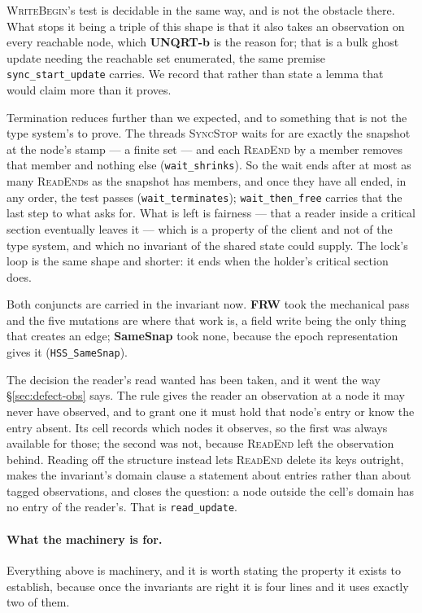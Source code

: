 \textsc{WriteBegin}'s test is decidable in the same way, and is not the obstacle
there.  What stops it being a triple of this shape is that it also takes an
\itr{} observation on every reachable node, which \textbf{UNQRT-b} is the reason
for; that is a bulk ghost update needing the reachable set enumerated, the same
premise \texttt{sync\_start\_update} carries.  We record that rather than state
a lemma that would claim more than it proves.

Termination reduces further than we expected, and to something that is not the
type system's to prove.  The threads \textsc{SyncStop} waits for are exactly the
snapshot at the node's stamp --- a finite set --- and each \textsc{ReadEnd} by a
member removes that member and nothing else (\texttt{wait\_shrinks}).  So the
wait ends after at most as many \textsc{ReadEnd}s as the snapshot has members,
and once they have all ended, in any order, the test passes
(\texttt{wait\_terminates}); \texttt{wait\_then\_free} carries that the last
step to what \frbl{} asks for.  What is left is fairness --- that a reader
inside a critical section eventually leaves it --- which is a property of the
client and not of the type system, and which no invariant of the shared state
could supply.  The lock's loop is the same shape and shorter: it ends when the
holder's critical section does.

Both conjuncts are carried in the invariant now.  \textbf{FRW} took the
mechanical pass and the five mutations are where that work is, a field write
being the only thing that creates an edge; \textbf{SameSnap} took none, because
the epoch representation gives it (\texttt{HSS\_SameSnap}).

The decision the reader's read wanted has been taken, and it went the way
\S\ref{sec:defect-obs} says.  The rule gives the reader an observation at a node
it may never have observed, and to grant one it must hold that node's entry or
know the entry absent.  Its cell records which nodes it observes, so the first
was always available for those; the second was not, because \textsc{ReadEnd}
left the \rt{} observation behind.  Reading \rt{} off the structure instead lets
\textsc{ReadEnd} delete its keys outright, makes the invariant's domain clause a
statement about entries rather than about tagged observations, and closes the
question: a node outside the cell's domain has no entry of the reader's.  That
is \texttt{read\_update}.

\paragraph{What the machinery is for.}
Everything above is machinery, and it is worth stating the property it exists
to establish, because once the invariants are right it is four lines and it uses
exactly two of them.

